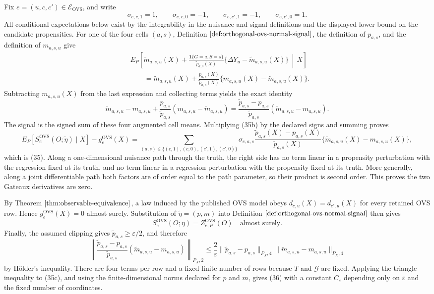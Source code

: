 Fix \(e=(u,c,c')\in\mathcal E_{\mathrm{OVS}}\), and write
\[
\sigma_{e,c,1}=1,\qquad \sigma_{e,c,0}=-1,\qquad
\sigma_{e,c',1}=-1,\qquad \sigma_{e,c',0}=1.
\]
All conditional expectations below exist by the integrability in the nuisance and signal definitions and the displayed lower bound on the candidate propensities.  For one of the four cells \((a,s)\), Definition \(\ref{def:orthogonal-ovs-normal-signal}\), the definition of \(p_{a,s}\), and the definition of \(m_{a,s,u}\) give
\[
\begin{aligned}
&E_P\!\left[\widetilde m_{a,s,u}(X)
+\frac{\mathbf 1\{G=a,S=s\}}{\widetilde p_{a,s}(X)}
 \{\Delta Y_u-\widetilde m_{a,s,u}(X)\}\,\middle|\,X\right]\\
&\qquad=\widetilde m_{a,s,u}(X)
+\frac{p_{a,s}(X)}{\widetilde p_{a,s}(X)}
 \{m_{a,s,u}(X)-\widetilde m_{a,s,u}(X)\}.
\end{aligned}
\tag{35a}
\]
Subtracting \(m_{a,s,u}(X)\) from the last expression and collecting terms yields the exact identity
\[
\widetilde m_{a,s,u}-m_{a,s,u}
+\frac{p_{a,s}}{\widetilde p_{a,s}}(m_{a,s,u}-\widetilde m_{a,s,u})
=\frac{\widetilde p_{a,s}-p_{a,s}}{\widetilde p_{a,s}}
 (\widetilde m_{a,s,u}-m_{a,s,u}).
\tag{35b}
\]
The signal is the signed sum of these four augmented cell means.  Multiplying (35b) by the declared signs and summing proves
\[
E_P[S_e^{\mathrm{OVS}}(O;\widetilde\eta)\mid X]-g_e^{\mathrm{OVS}}(X)
=\sum_{(a,s)\in\{(c,1),(c,0),(c',1),(c',0)\}}
\sigma_{e,a,s}
\frac{\widetilde p_{a,s}(X)-p_{a,s}(X)}{\widetilde p_{a,s}(X)}
\{\widetilde m_{a,s,u}(X)-m_{a,s,u}(X)\},
\]
which is (35).  Along a one-dimensional nuisance path through the truth, the right side has no term linear in a propensity perturbation with the regression fixed at its truth, and no term linear in a regression perturbation with the propensity fixed at its truth.  More generally, along a joint differentiable path both factors are of order equal to the path parameter, so their product is second order.  This proves the two Gateaux derivatives are zero.

By Theorem \(\ref{thm:observable-equivalence}\), a law induced by the published OVS model obeys \(d_{c,u}(X)=d_{c',u}(X)\) for every retained OVS row.  Hence \(g_e^{\mathrm{OVS}}(X)=0\) almost surely.  Substitution of \(\widetilde\eta=(p,m)\) into Definition \(\ref{def:orthogonal-ovs-normal-signal}\) then gives
\[
S_e^{\mathrm{OVS}}(O;\eta)=Z_{e,P}^{\mathrm{OVS}}(O)
\quad\text{almost surely}.
\]
Finally, the assumed clipping gives \(\widetilde p_{a,s}\ge\varepsilon/2\), and therefore
\[
\left\|
\frac{\widetilde p_{a,s}-p_{a,s}}{\widetilde p_{a,s}}
(\widetilde m_{a,s,u}-m_{a,s,u})
\right\|_{P_X,2}
\le \frac{2}{\varepsilon}
\|\widetilde p_{a,s}-p_{a,s}\|_{P_X,4}
\|\widetilde m_{a,s,u}-m_{a,s,u}\|_{P_X,4}
\tag{35c}
\]
by H\"older's inequality.  There are four terms per row and a fixed finite number of rows because \(T\) and \(\mathcal G\) are fixed.  Applying the triangle inequality to (35c), and using the finite-dimensional norms declared for \(p\) and \(m\), gives (36) with a constant \(C_\varepsilon\) depending only on \(\varepsilon\) and the fixed number of coordinates.

